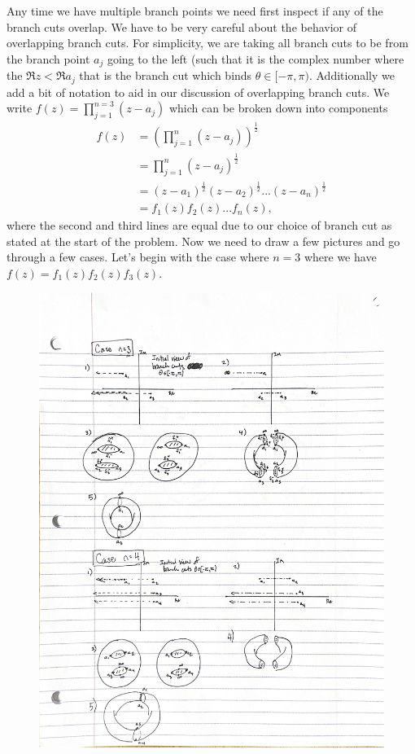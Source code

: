\documentclass[10pt]{amsart}
\theoremstyle{nonumberplain}
\begin{document}
\begin{enumerate}[label={\bf {\arabic*}:}]
Any time we have multiple branch points we need first inspect if any of the branch cuts overlap.
We have to be very careful about the behavior of overlapping branch cuts.
For simplicity, we are taking all branch cuts to be from the branch point $a_j$ going to the left (such that it is the complex number where the $\Re z < \Re a_j$ that is the branch cut which binds $\theta \in [-\pi, \pi)$.
Additionally we add a bit of notation to aid in our discussion of overlapping branch cuts. We write $f(z) = \prod_{j=1}^{n=3}\left(z-a_j\right)$ which can be broken down into components
\begin{align*}
f(z) &= \left(\prod_{j=1}^{n}\left(z-a_j\right)\right)^\frac{1}{2} \\
      &= \prod_{j=1}^{n}\left(z-a_j\right)^\frac{1}{2} \\
      &= (z - a_1)^\frac{1}{2}(z - a_2)^\frac{1}{2}...(z - a_n)^\frac{1}{2} \\
      &= f_1(z)f_2(z)...f_n(z),
\end{align*}
where the second and third lines are equal due to our choice of branch cut as stated at the start of the problem.
Now we need to draw a few pictures and go through a few cases.
Let's begin with the case where $n = 3$ where we have $f(z) = f_1(z)f_2(z)f_3(z)$.
\begin{figure}[h]
	\centering
	\includegraphics[width=1\textwidth]{riemann_surface_3_4}

\end{figure}
\end{enumerate}
\end{document}
